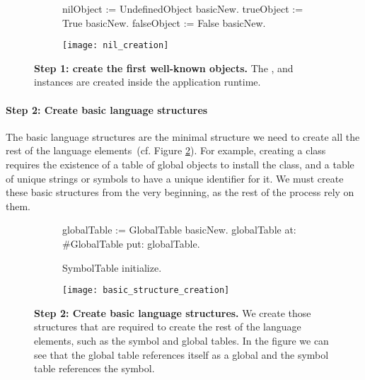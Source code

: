 \begin{figure}[ht]
\begin{subfigure}{.4\linewidth}
\begin{code}
nilObject := UndefinedObject basicNew.
trueObject := True basicNew.
falseObject := False basicNew.
\end{code}
\end{subfigure}
\begin{subfigure}{.6\linewidth}
\texttt{[image: nil\_creation]}
\end{subfigure}
\caption{\textbf{Step 1: create the first well-known objects.} The ,  and  instances are created inside the application runtime.\label{fig:nil_creation}}
\end{figure}


\paragraph{\textbf{Step 2: Create basic language structures}}

The basic language structures are the minimal structure we need to create all the rest of the language elements~(cf. Figure \ref{fig:basic_structure_creation}). For example, creating a class requires the existence of a table of global objects to install the class, and a table of unique strings or symbols to have a unique identifier for it. We must create these basic structures from the very beginning, as the rest of the process rely on them.

\begin{figure}[ht]
\begin{subfigure}{.45\linewidth}
\begin{code}
globalTable := GlobalTable basicNew.
globalTable
    at: #GlobalTable
    put: globalTable.
    
SymbolTable initialize.
\end{code}
\end{subfigure}
\begin{subfigure}{.55\linewidth}
\texttt{[image: basic\_structure\_creation]}
\end{subfigure}
\caption{\textbf{Step 2: Create basic language structures.} We create those structures that are required to create the rest of the language elements, such as the symbol and global tables. In the figure we can see that the global table references itself as a global and the symbol table references the  symbol.\label{fig:basic_structure_creation}}
\end{figure}

